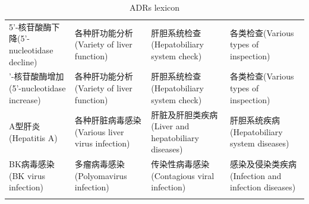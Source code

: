 \begin{table}
	\centering
	\caption{ADRs lexicon}
	\label{tab:1}       %
	\begin{tabular}{p{2cm}p{2cm}p{2cm}p{2cm}}
		\hline\noalign{\smallskip}
		5’-核苷酸酶下降(5'-nucleotidase decline)&各种肝功能分析(Variety of liver function)&肝胆系统检查(Hepatobiliary system check)&各类检查(Various types of inspection) \\
		\noalign{\smallskip}\hline
		5’-核苷酸酶增加(5'-nucleotidase increase)&各种肝功能分析(Variety of liver function)&肝胆系统检查(Hepatobiliary system check)&各类检查(Various types of inspection)\\
		\noalign{\smallskip}\hline
		A型肝炎(Hepatitis A)&各种肝脏病毒感染(Various liver virus infection)&肝脏及肝胆类疾病(Liver and hepatobiliary diseases)&肝胆系统疾病(Hepatobiliary system diseases)\\	
		\noalign{\smallskip}\hline
		BK病毒感染(BK virus infection)&多瘤病毒感染(Polyomavirus infection)&传染性病毒感染(Contagious viral infection)&感染及侵染类疾病(Infection and infection diseases)
		\\
		\noalign{\smallskip}\hline
	\end{tabular}
\end{table}

